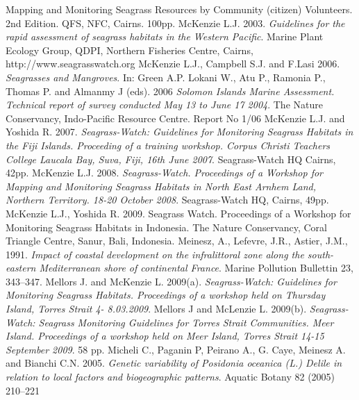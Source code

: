 \documentclass[10pt, a4paper]{article}
\begin{document}
\begin{thebibliography}{999}
{Mapping and Monitoring Seagrass Resources by Community (citizen) Volunteers}. 2nd
Edition. QFS, NFC, Cairns. 100pp. \pageref{McKenzie03}
McKenzie L.J. 2003. \emph{Guidelines for the rapid assessment of seagrass habitats in the
Western Pacific}. Marine Plant Ecology Group, QDPI, Northern Fisheries Centre, Cairns,
http://www.seagrasswatch.org \pageref{McKenzieetal03}
McKenzie L.J., Campbell S.J. and F.Lasi 2006. \emph{Seagrasses and Mangroves}. In: Green
A.P. Lokani W., Atu P., Ramonia P., Thomas P. and Almanmy J (eds). 2006 \emph{Solomon
Islands Marine Assessment. Technical report of survey conducted May 13 to June 17 2004}.
The Nature Conservancy, Indo-Pacific Resource Centre. Report No 1/06 \pageref{McKenzie06}
McKenzie L.J. and Yoshida R. 2007. \emph{Seagrass-Watch: Guidelines for Monitoring
Seagrass Habitats in the Fiji Islands. Proceeding of a training workshop. Corpus Christi
Teachers College Laucala Bay, Suva, Fiji, 16th June 2007}. Seagrass-Watch HQ Cairns, 42pp. \pageref{McKenzie07}
McKenzie L.J. 2008. \emph{Seagrass-Watch. Proceedings of a Workshop for Mapping and
Monitoring Seagrass Habitats in North East Arnhem Land, Northern Territory. 18-20
October 2008}. Seagrass-Watch HQ, Cairns, 49pp. \pageref{McKenzie08}
McKenzie L.J., Yoshida R. 2009. Seagrass Watch. Proceedings of a Workshop for
Monitoring Seagrass Habitats in Indonesia. The Nature Conservancy, Coral Triangle
Centre, Sanur, Bali, Indonesia. \pageref{McKenzie09}
Meinesz, A., Lefevre, J.R., Astier, J.M., 1991. \emph{Impact of coastal development on the
infralittoral zone along the south-eastern Mediterranean shore of continental France}.
Marine Pollution Bullettin 23, 343–347. \pageref{Meinesz91}
Mellors J. and McKenzie L. 2009(a). \emph{Seagrass-Watch: Guidelines for Monitoring
Seagrass Habitats. Proceedings of a workshop held on Thursday Island, Torres Strait 4-
8.03.2009}. \pageref{Mellors09a}
Mellors J and McLenzie L. 2009(b). \emph{Seagrass-Watch: Seagrass Monitoring Guidelines
for Torres Strait Communities. Meer Island. Proceedings of a workshop held on Meer
Island, Torres Strait 14-15 September 2009}. 58 pp. \pageref{Mellors09b}
Micheli C., Paganin P, Peirano A., G. Caye, Meinesz A. and Bianchi C.N. 2005. \emph{Genetic
variability of \textit{{Posidonia oceanica}} (L.) Delile in relation to local factors and biogeographic
patterns}. Aquatic Botany 82 (2005) 210–221 \pageref{Micheli05}

\end{thebibliography}
\end{document}
